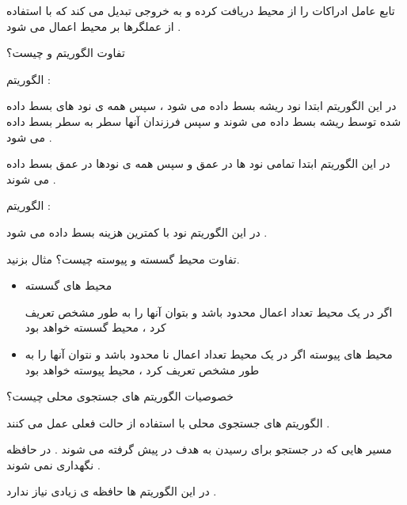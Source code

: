 \documentclass[12pt]{article}
\begin{document}
\begin{tcolorbox}
تابع عامل ادراکات را از محیط دریافت کرده و به خروجی تبدیل می کند که با استفاده از عملگرها بر محیط اعمال می شود .
\end{tcolorbox}





\vspace{20pt}
\noindent
تفاوت الگوریتم
 و 
 چیست؟




\begin{tcolorbox}
الگوریتم 
  : 
 
 در این الگوریتم ابتدا نود ریشه بسط داده می شود ، سپس همه ی نود های بسط داده شده توسط ریشه بسط داده می شوند و سپس فرزندان آنها سطر به سطر بسط داده می شود .
 
 در این الگوریتم ابتدا تمامی نود ها در عمق 
 و سپس همه ی نودها  در عمق
 بسط داده می شوند .
 
 
 \vspace{20pt}
 
 الگوریتم
   : 
  
  در این الگوریتم نود با کمترین هزینه بسط داده می شود .

\end{tcolorbox}



\newpage
\vspace{20pt}
\noindent
تفاوت محیط گسسته و پیوسته چیست؟ مثال بزنید.

\begin{tcolorbox}
\begin{itemize}
	\item محیط های گسسته
	
	اگر در یک محیط تعداد اعمال محدود باشد و بتوان آنها را به طور مشخص تعریف کرد ، محیط گسسته خواهد بود 
	\item محیط های پیوسته
	اگر در یک محیط تعداد اعمال نا محدود باشد و نتوان آنها را به طور مشخص تعریف کرد ، محیط پیوسته خواهد بود 
\end{itemize}
\end{tcolorbox}


\vspace{20pt}
\noindent
خصوصیات الگوریتم های جستجوی محلی چیست؟





\begin{tcolorbox}
الگوریتم های جستجوی محلی با استفاده از حالت فعلی عمل می کنند .

\vspace{20pt}

مسیر هایی که در جستجو برای رسیدن به هدف در پیش گرفته می شوند . در حافظه نگهداری نمی شوند .

\vspace{20pt}

در این الگوریتم ها حافظه ی زیادی نیاز ندارد .
\end{tcolorbox}
\end{document}
